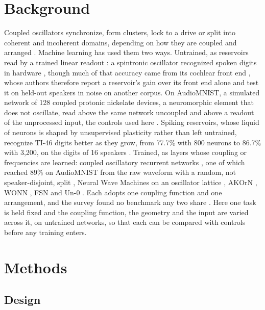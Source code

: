 \documentclass[10pt]{article}
\makeatletter
\newcommand{\tmlr@floatbarrier}{\par\vspace{\z@}%
  \ifx\@deferlist\@empty\else\clearpage\fi}
\let\tmlr@section\section
\renewcommand{\section}{\tmlr@floatbarrier\tmlr@section}
\makeatother
\begin{document}
\section{Background}\label{background}

Coupled oscillators synchronize, form clusters, lock to a drive or split
into coherent and incoherent domains, depending on how they are coupled
and arranged
\citep{pikovsky2001, strogatz2000, kuramoto2002, abrams2004}. Machine
learning has used them two ways. Untrained, as reservoirs read by a
trained linear readout \citep{jaeger2001, maass2002, tanaka2019}: a
spintronic oscillator recognized spoken digits in hardware
\citep{torrejon2017}, though much of that accuracy came from its
cochlear front end \citep{abreu-araujo2020}, whose authors therefore
report a reservoir's gain over its front end alone and test it on
held-out speakers in noise on another corpus. On AudioMNIST, a simulated
network of 128 coupled protonic nickelate devices, a neuromorphic
element that does not oscillate, read above the same network uncoupled
and above a readout of the unprocessed input, the controls used here
\citep{zhou2026}. Spiking reservoirs, whose liquid of neurons is shaped
by unsupervised plasticity rather than left untrained, recognize TI-46
digits better as they grow, from 77.7\% with 800 neurons to 86.7\% with
3,200, on the digits of 16 speakers \citep{srinivasan2018}. Trained, as
layers whose coupling or frequencies are learned: coupled oscillatory
recurrent networks \citep{rusch2021}, one of which reached 89\% on
AudioMNIST from the raw waveform with a random, not speaker-disjoint,
split \citep{chandravadia2026}, Neural Wave Machines on an oscillator
lattice \citep{keller2023}, AKOrN \citep{miyato2025}, WONN
\citep{dai2026}, FSN \citep{nunley2026} and Un-0 \citep{unconv-ai2026}.
Each adopts one coupling function and one arrangement, and the survey
found no benchmark any two share \citep{kryski2026}. Here one task is
held fixed and the coupling function, the geometry and the input are
varied across it, on untrained networks, so that each can be compared
with controls before any training enters.

\section{Methods}\label{methods}

\subsection{Design}\label{design}
\end{document}
